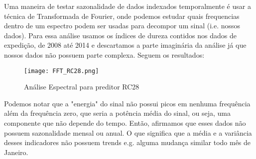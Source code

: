 Uma maneira de testar sazonalidade de dados indexados temporalmente é usar a técnica de Transformada de Fourier, onde podemos estudar quais frequencias dentro de um espectro podem ser usadas para decompor um sinal (i.e. nossos dados). Para essa análise usamos os índices de dureza contidos nos dados de expedição, de 2008 até 2014 e descartamos a parte imaginária da análise já que nossos dados não possuem parte complexa. Seguem os resultados:

\begin{figure}[H]
\centering
\texttt{[image: FFT\_RC28.png]}
\caption{Análise Espectral para preditor RC28}
\end{figure}


Podemos notar que a "energia" do sinal não possui picos em nenhuma frequência além da frequência zero, que seria a potência média do sinal, ou seja, uma componente que não depende do tempo. Então, afirmamos que esses dados não possuem sazonalidade mensal ou anual. O que significa que a média e a variância desses indicadores não possuem trends e.g. alguma mudança similar todo mês de Janeiro.


